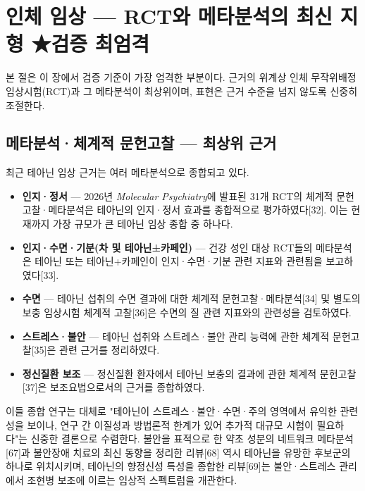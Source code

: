 \documentclass[11pt,oneside]{book}
\begin{document}
\section{인체 임상 — RCT와 메타분석의 최신 지형 ★검증 최엄격}
본 절은 이 장에서 검증 기준이 가장 엄격한 부분이다. 근거의 위계상 인체 무작위배정 임상시험(RCT)과 그 메타분석이 최상위이며, 표현은 근거 수준을 넘지 않도록 신중히 조절한다.

\subsection{메타분석·체계적 문헌고찰 — 최상위 근거}
최근 테아닌 임상 근거는 여러 메타분석으로 종합되고 있다.

\begin{itemize}[leftmargin=6mm,itemsep=1pt,topsep=2pt]
  \item \textbf{인지·정서} — 2026년 \textit{Molecular Psychiatry}에 발표된 31개 RCT의 체계적 문헌고찰·메타분석은 테아닌의 인지·정서 효과를 종합적으로 평가하였다[32]. 이는 현재까지 가장 규모가 큰 테아닌 임상 종합 중 하나다.
  \item \textbf{인지·수면·기분(차 및 테아닌±카페인)} — 건강 성인 대상 RCT들의 메타분석은 테아닌 또는 테아닌+카페인이 인지·수면·기분 관련 지표와 관련됨을 보고하였다[33].
  \item \textbf{수면} — 테아닌 섭취의 수면 결과에 대한 체계적 문헌고찰·메타분석[34] 및 별도의 보충 임상시험 체계적 고찰[36]은 수면의 질 관련 지표와의 관련성을 검토하였다.
  \item \textbf{스트레스·불안} — 테아닌 섭취와 스트레스·불안 관리 능력에 관한 체계적 문헌고찰[35]은 관련 근거를 정리하였다.
  \item \textbf{정신질환 보조} — 정신질환 환자에서 테아닌 보충의 결과에 관한 체계적 문헌고찰[37]은 보조요법으로서의 근거를 종합하였다.
\end{itemize}
이들 종합 연구는 대체로 "테아닌이 스트레스·불안·수면·주의 영역에서 유익한 관련성을 보이나, 연구 간 이질성과 방법론적 한계가 있어 추가적 대규모 시험이 필요하다"는 신중한 결론으로 수렴한다. 불안을 표적으로 한 약초 성분의 네트워크 메타분석[67]과 불안장애 치료의 최신 동향을 정리한 리뷰[68] 역시 테아닌을 유망한 후보군의 하나로 위치시키며, 테아닌의 향정신성 특성을 종합한 리뷰[69]는 불안·스트레스 관리에서 조현병 보조에 이르는 임상적 스펙트럼을 개관한다.
\end{document}
